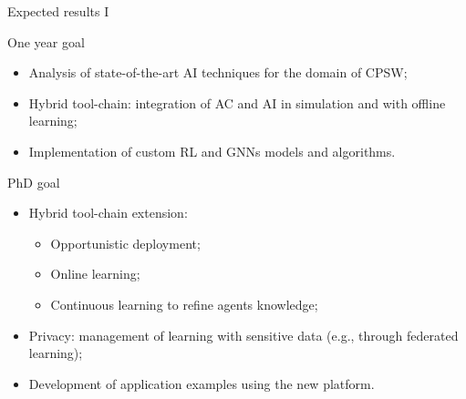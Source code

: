 \documentclass[presentation]{beamer}\mode<presentation>{\usetheme{AMSBolognaFC}}
\begin{document}
	


\begin{frame}[c]{Expected results I}

\begin{block}{One year goal}
	\begin{itemize}
		\item Analysis of state-of-the-art AI techniques
			for the domain of CPSW;
		\item Hybrid tool-chain: integration of AC and AI in simulation and with
		offline learning;
		\item Implementation of custom RL and GNNs models
		and algorithms.
	\end{itemize}
\end{block}

\begin{alertblock}{PhD goal}
	\begin{itemize}
		\item Hybrid tool-chain extension:
		\begin{itemize}
			\item Opportunistic deployment;
			\item Online learning; 
			\item Continuous learning to refine agents knowledge;
		\end{itemize}
		\item Privacy: management of learning with sensitive data 
			(e.g., through federated learning);
		\item Development of application examples using the new platform.
	\end{itemize}
\end{alertblock}

\end{frame}
\end{document}
